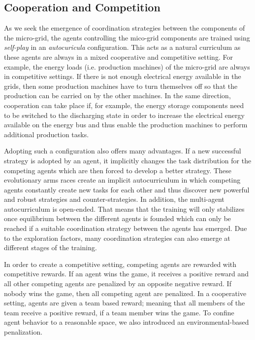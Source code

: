 \subsection{Cooperation and Competition}
\label{subsec:42}
As we seek the emergence of coordination strategies between the components of the micro-grid, the agents controlling the mico-grid components are trained using \textit{self-play} in an \textit{autocuricula} configuration. This acts as a natural curriculum as these agents are always in a mixed cooperative and competitive setting. For example, the energy loads (i.e. production machines) of the micro-grid are always in competitive settings. If there is not enough electrical energy available in the grids, then some production machines have to turn themselves off so that the production can be carried on by the other machines. In the same direction, cooperation can take place if, for example, the energy storage components need to be switched to the discharging state in order to increase the electrical energy available on the energy bus and thus enable the production machines to perform additional production tasks.

Adopting such a configuration also offers many advantages. If a new successful strategy is adopted by an agent, it implicitly changes the task distribution for the competing agents which are then forced to develop a better strategy. These evolutionary arms races create an implicit autocurriculum in which competing agents constantly create new tasks for each other and thus discover new powerful and robust strategies and counter-strategies. In addition, the multi-agent autocurriculum is open-ended. That means that the training will only stabilizes once equilibrium between the different agents is founded which can only be reached if a suitable coordination strategy between the agents has emerged. Due to the exploration factors, many coordination strategies can also emerge at different stages of the training.

In order to create a competitive setting, competing agents are rewarded with competitive rewards. If an agent wins the game, it receives a positive reward and all other competing agents are penalized by an opposite negative reward. If nobody wins the game, then all competing agent are penalized. In a cooperative setting, agents are given a team based reward; meaning that all members of the team receive a positive reward, if a team member wins the game. To confine agent behavior to a reasonable space, we also introduced an environmental-based penalization.

